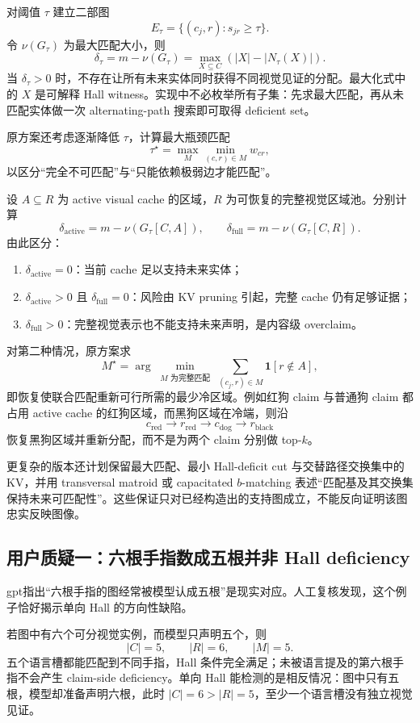 \documentclass[UTF8,zihao=-4,a4paper]{ctexart}
\begin{document}
对阈值 $\tau$ 建立二部图
\[
E_\tau=\{(c_j,r):s_{jr}\ge\tau\}.
\]
令 $\nu(G_\tau)$ 为最大匹配大小，则
\[
\delta_\tau
=m-\nu(G_\tau)
=\max_{X\subseteq C}\left(|X|-|N_\tau(X)|\right).
\]
当 $\delta_\tau>0$ 时，不存在让所有未来实体同时获得不同视觉见证的分配。最大化式中的 $X$ 是可解释 Hall witness。实现中不必枚举所有子集：先求最大匹配，再从未匹配实体做一次 alternating-path 搜索即可取得 deficient set。

原方案还考虑逐渐降低 $\tau$，计算最大瓶颈匹配
\[
\tau^\star=\max_M\min_{(c,r)\in M}w_{cr},
\]
以区分“完全不可匹配”与“只能依赖极弱边才能匹配”。

设 $A\subseteq R$ 为 active visual cache 的区域，$R$ 为可恢复的完整视觉区域池。分别计算
\[
\delta_{\mathrm{active}}=m-\nu(G_\tau[C,A]),
\qquad
\delta_{\mathrm{full}}=m-\nu(G_\tau[C,R]).
\]
由此区分：

\begin{enumerate}
  \item $\delta_{\mathrm{active}}=0$：当前 cache 足以支持未来实体；
  \item $\delta_{\mathrm{active}}>0$ 且 $\delta_{\mathrm{full}}=0$：风险由 KV pruning 引起，完整 cache 仍有足够证据；
  \item $\delta_{\mathrm{full}}>0$：完整视觉表示也不能支持未来声明，是内容级 overclaim。
\end{enumerate}

对第二种情况，原方案求
\[
M^\star
=\arg\min_{\substack{M\text{ 为完整匹配}}}
\sum_{(c_j,r)\in M}\mathbf{1}[r\notin A],
\]
即恢复使联合匹配重新可行所需的最少冷区域。例如红狗 claim 与普通狗 claim 都占用 active cache 的红狗区域，而黑狗区域在冷端，则沿
\[
c_{\mathrm{red}}
\rightarrow r_{\mathrm{red}}
\rightarrow c_{\mathrm{dog}}
\rightarrow r_{\mathrm{black}}
\]
恢复黑狗区域并重新分配，而不是为两个 claim 分别做 top-$k$。

更复杂的版本还计划保留最大匹配、最小 Hall-deficit cut 与交替路径交换集中的 KV，并用 transversal matroid 或 capacitated $b$-matching 表述“匹配基及其交换集保持未来可匹配性”。这些保证只对已经构造出的支持图成立，不能反向证明该图忠实反映图像。

\subsection{用户质疑一：六根手指数成五根并非 Hall deficiency}

gpt指出“六根手指的图经常被模型认成五根”是现实对应。人工复核发现，这个例子恰好揭示单向 Hall 的方向性缺陷。

若图中有六个可分视觉实例，而模型只声明五个，则
\[
|C|=5,\qquad |R|=6,\qquad |M|=5.
\]
五个语言槽都能匹配到不同手指，Hall 条件完全满足；未被语言提及的第六根手指不会产生 claim-side deficiency。单向 Hall 能检测的是相反情况：图中只有五根，模型却准备声明六根，此时 $|C|=6>|R|=5$，至少一个语言槽没有独立视觉见证。
\end{document}
